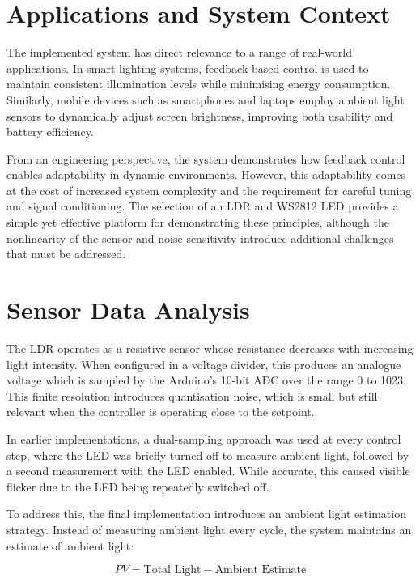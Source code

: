 \documentclass[conference]{IEEEtran}
\begin{document}
\section{Applications and System Context}

The implemented system has direct relevance to a range of real-world applications. In smart lighting systems, feedback-based control is used to maintain consistent illumination levels while minimising energy consumption. Similarly, mobile devices such as smartphones and laptops employ ambient light sensors to dynamically adjust screen brightness, improving both usability and battery efficiency.

From an engineering perspective, the system demonstrates how feedback control enables adaptability in dynamic environments. However, this adaptability comes at the cost of increased system complexity and the requirement for careful tuning and signal conditioning. The selection of an LDR and WS2812 LED provides a simple yet effective platform for demonstrating these principles, although the nonlinearity of the sensor and noise sensitivity introduce additional challenges that must be addressed.

\section{Sensor Data Analysis}

The LDR operates as a resistive sensor whose resistance decreases with increasing light intensity. When configured in a voltage divider, this produces an analogue voltage which is sampled by the Arduino's 10-bit ADC over the range 0 to 1023. This finite resolution introduces quantisation noise, which is small but still relevant when the controller is operating close to the setpoint.

In earlier implementations, a dual-sampling approach was used at every control step, where the LED was briefly turned off to measure ambient light, followed by a second measurement with the LED enabled. While accurate, this caused visible flicker due to the LED being repeatedly switched off.

To address this, the final implementation introduces an ambient light estimation strategy. Instead of measuring ambient light every cycle, the system maintains an estimate of ambient light:

\begin{equation}
PV = \text{Total Light} - \text{Ambient Estimate}
\end{equation}
\end{document}
